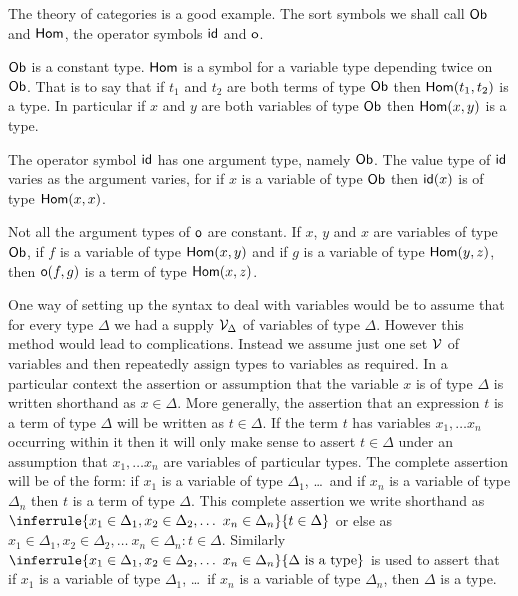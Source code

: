 The theory of categories is a good example.
%
The sort symbols we shall call $\mathsf{Ob}$ and $\mathsf{Hom}$, the operator symbols $\mathsf{id}$ and $\mathsf{o}$.

$\mathsf{Ob}$ is a constant type.  $\mathsf{Hom}$ is a symbol for a variable type depending twice on $\mathsf{Ob}$.
%
That is to say that if $t_1$ and $t_2$ are both terms of type $\mathsf{Ob}$ then $\mathsf{Hom}(t_1,t_2)$ is a type.
%
In particular if $x$ and $y$ are both variables of type $\mathsf{Ob}$ then $\mathsf{Hom}(x,y)$ is a type.


The operator symbol $\mathsf{id}$ has one argument type, namely $\mathsf{Ob}$.
%
The value type of $\mathsf{id}$ varies as the argument varies, for if $x$ is a variable of type $\mathsf{Ob}$ then $\mathsf{id}(x)$ is of type $\mathsf{Hom}(x,x)$.

Not all the argument types of $\mathsf{o}$ are constant.
%
If $x$, $y$ and $x$ are variables of type $\mathsf{Ob}$, if $f$ is a variable of type $\mathsf{Hom}(x,y)$ and if $g$ is a variable of type $\mathsf{Hom}(y,z)$, then $\mathsf{o}(f,g)$ is a term of type $\mathsf{Hom}(x,z)$.

One way of setting up the syntax to deal with variables would be to assume that for every type $\Delta$ we had a supply $\mathcal{V}_\Delta$ of variables of type $\Delta$.
%
However this method would lead to complications.
%
Instead we assume just one set $\mathcal{V}$ of variables and then repeatedly assign types to variables as required.
%
In a particular context the assertion or assumption that the variable $x$ is of type $\Delta$ is written shorthand as $x \in \Delta$.
%
More generally, the assertion that an expression $t$ is a term of type $\Delta$ will be written as $t \in \Delta$.
%
If the term $t$ has variables $x_1,\ldots x_n$ occurring within it then it will only make sense to assert $t \in \Delta$ under an assumption that $x_1,\ldots x_n$ are variables of particular types.
%
The complete assertion will be of the form: if $x_1$ is a variable of type $\Delta_1$, \ldots\ and if $x_n$ is a variable of type $\Delta_n$ then $t$ is a term of type $\Delta$.
%
This complete assertion we write shorthand as
%
$ \inferrule
{ x_1 \in \Delta_1, x_2 \in \Delta_2, \ldots\ x_n \in \Delta_n }
{ t \in \Delta } $
%
or else as $x_1 \in \Delta_1, x_2 \in \Delta_2, \ldots\ x_n \in \Delta_n : t \in \Delta$.
%
%
Similarly
%
$ \inferrule
{ x_1 \in \Delta_1, x_2 \in \Delta_2, \ldots\ x_n \in \Delta_n }
{ \Delta \isatype } $
%
is used to assert that if $x_1$ is a variable of type $\Delta_1$, \ldots\ if $x_n$ is a variable of type $\Delta_n$, then $\Delta$ is a type.

